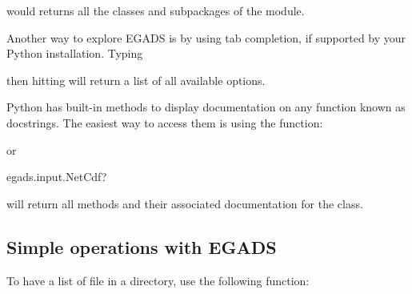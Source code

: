 \documentclass[a4paper,10pt,openany,english]{sphinxmanual}
\begin{document}
\begin{sphinxVerbatim}[commandchars=\\\{\}]
\end{sphinxVerbatim}

would returns all the classes and subpackages of the  module.

Another way to explore EGADS is by using tab completion, if supported by your Python installation. Typing

\begin{sphinxVerbatim}[commandchars=\\\{\}]
\end{sphinxVerbatim}

then hitting  will return a list of all available options.

Python has built-in methods to display documentation on any function known as docstrings.
The easiest way to access them is using the  function:

\begin{sphinxVerbatim}[commandchars=\\\{\}]
\end{sphinxVerbatim}

or

\begin{sphinxVerbatim}[commandchars=\\\{\}]
\PYGZgt{}\PYGZgt{}\PYGZgt{} egads.input.NetCdf?
\end{sphinxVerbatim}

will return all methods and their associated documentation for the {\hyperref[egadsapi:egads.input.netcdf_io.NetCdf]{}} class.


\subsection{Simple operations with EGADS}
\label{tutorial:simple-operations-with-egads}
To have a list of file in a directory, use the following function:

\begin{sphinxVerbatim}[commandchars=\\\{\}]
\end{sphinxVerbatim}
\newpage
\end{document}
